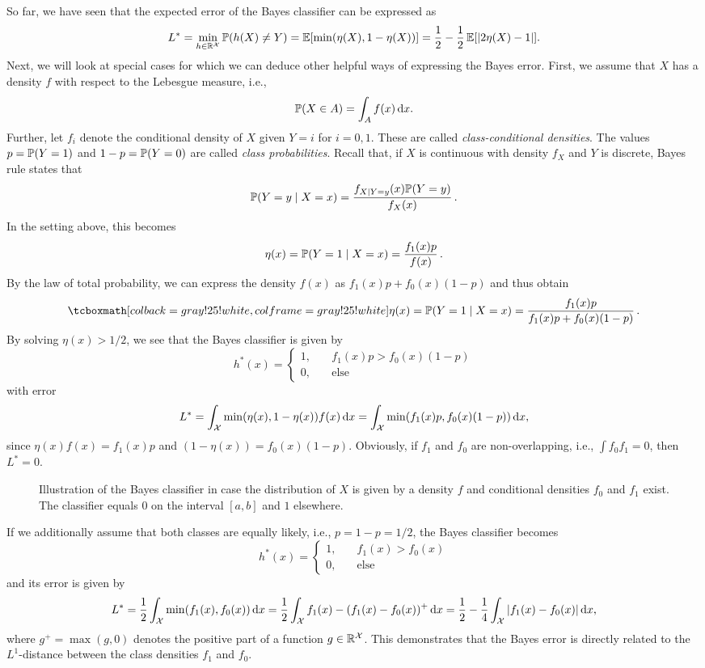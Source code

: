 So far, we have seen that the expected error of the Bayes classifier can be expressed as
\[
    L^* = \min_{h \in \R^{\mathcal{X}}} \P(h(X) \neq Y) = \Exp[\min(\eta(X), 1 - \eta(X))] = \frac{1}{2} - \frac{1}{2} \Exp[\abs{2\eta(X) - 1}].
\]
Next, we will look at special cases for which we can deduce other helpful ways of expressing the Bayes error. First, we assume that $X$ has a density $f$ with respect to the Lebesgue measure, i.e.,
\[
    \P(X \in A) = \int_{A} f(x) \dx.
\]
Further, let $f_i$ denote the conditional density of $X$ given $Y = i$ for $i = 0, 1$. These are called \emph{class-conditional densities}. The values $p = \P(Y = 1)$ and $1 - p = \P(Y = 0)$ are called \emph{class probabilities}. Recall that, if $X$ is continuous with density $f_X$ and $Y$ is discrete, Bayes rule states that
\[
    \P(Y = y \given X = x) = \frac{f_{X \given Y = y}(x) \P(Y = y)}{f_X(x)} \, .
\]
In the setting above, this becomes
\[
    \eta(x) = \P(Y = 1 \given X = x) = \frac{f_1(x) p}{f(x)} \, .
\]
By the law of total probability, we can express the density $f(x)$ as $f_1(x)p + f_0(x)(1 - p)$ and thus obtain
\begin{equation}
    \highlightMath{
        \eta(x) = \P(Y = 1 \given X = x) = \frac{f_1(x) p}{f_1(x)p + f_0(x)(1 - p)} \, .
    }
\end{equation}
By solving $\eta(x) > 1/2$, we see that the Bayes classifier is given by
\begin{equation}
\label{eq: bayes classifier for X with density}
    h^*(x) = \begin{cases}
        1, \quad & f_1(x)p > f_0(x)(1 - p) \\
        0, \quad & \text{else}
    \end{cases}
\end{equation}
with error
\[
    L^* = \int_{\mathcal{X}} \min(\eta(x), 1 - \eta(x)) f(x) \dx = \int_{\mathcal{X}} \min(f_1(x)p, f_0(x)(1 - p)) \dx,
\]
since $\eta(x)f(x) = f_1(x)p$ and $(1 - \eta(x)) = f_0(x)(1 - p)$. Obviously, if $f_1$ and $f_0$ are non-overlapping, i.e., $\int f_0 f_1 = 0$, then $L^* = 0$.
\begin{figure}
    \centering
    \resizebox{9cm}{!}{}
    \caption{%
        Illustration of the Bayes classifier in case the distribution of $X$ is given by a density $f$ and conditional densities $f_0$ and $f_1$ exist. The classifier equals $0$ on the interval $[a, b]$ and $1$ elsewhere.
    }
\end{figure}
If we additionally assume that both classes are equally likely, i.e., $p = 1 - p = 1/2$, the Bayes classifier becomes
\[
    h^*(x) = \begin{cases}
        1, \quad & f_1(x) > f_0(x) \\
        0, \quad & \text{else}
    \end{cases}
\]
and its error is given by
\[
    L^* = \frac{1}{2} \int_{\mathcal{X}} \min(f_1(x), f_0(x)) \dx = \frac{1}{2} \int_{\mathcal{X}} f_1(x) - (f_1(x) - f_0(x))^{+} \dx = \frac{1}{2} - \frac{1}{4} \int_{\mathcal{X}} \abs{f_1(x) - f_0(x)} \dx,
\]
where $g^{+} = \max(g, 0)$ denotes the positive part of a function $g \in \R^{\mathcal{X}}$. This demonstrates that the Bayes error is directly related to the $L^1$-distance between the class densities $f_1$ and $f_0$.
